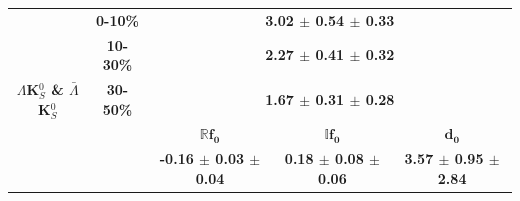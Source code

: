 \documentclass[../AnalysisNoteJBuxton.tex]{subfiles}
\begin{document}
\begin{landscape}
\begin{table}[htbp]
{\begin{tabular}{|c|c|c|c|c|}
  \multirow{5}{*}{\large \textbf{$\Lambda$K$^{0}_{S}$ \& $\bar{\Lambda}$K$^{0}_{S}$}}  
   &  \textbf{0-10\%} & \multicolumn{3}{c|}{\textbf{3.02 $\pm$ 0.54 $\pm$ 0.33}} \\  %
   & \textbf{10-30\%} & \multicolumn{3}{c|}{\textbf{2.27 $\pm$ 0.41 $\pm$ 0.32}} \\  %
   & \textbf{30-50\%} & \multicolumn{3}{c|}{\textbf{1.67 $\pm$ 0.31 $\pm$ 0.28}} \\  %
   \cline{2-5}   
   & & \large $\mathbf{\mathbb{R}f_{0}}$ & \large $\mathbf{\mathbb{I}f_{0}}$ & \large $\mathbf{d_{0}}$ \\
   \cline{3-5} 
   & & \textbf{-0.16 $\pm$ 0.03 $\pm$ 0.04} & \textbf{0.18 $\pm$ 0.08 $\pm$ 0.06} & \textbf{3.57 $\pm$ 0.95 $\pm$ 2.84} \\
  \hline
 \end{tabular}}
 \label{tab:FitResultsLamKchandLamK0QM2}
\end{table}


\clearpage
\begin{table}[htbp]
 \centering
 \label{tab:FitResultsLamKchPQM}
\end{table}


\end{landscape}
\end{document}
